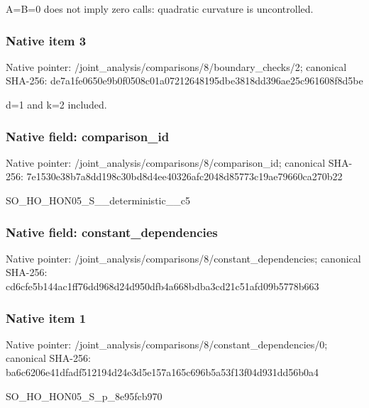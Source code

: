 \documentclass[10pt,a4paper]{article}
\begin{document}
\begingroup\raggedright\sloppy A=\allowbreak{}B=\allowbreak{}0 does not imply zero calls:\allowbreak{} quadratic curvature is uncontrolled.\par\endgroup

\subsubsection{Native item 3}
Native pointer: /joint\_\allowbreak{}analysis/comparisons/8/boundary\_\allowbreak{}checks/2; canonical SHA-256: de7a1fe0650e9b0f0508c01a07212648195dbe3818dd396ae25c961608f8d5be

\begingroup\raggedright\sloppy d=\allowbreak{}1 and k=\allowbreak{}2 included.\par\endgroup

\subsubsection{Native field: comparison\_\allowbreak{}id}
Native pointer: /joint\_\allowbreak{}analysis/comparisons/8/comparison\_\allowbreak{}id; canonical SHA-256: 7e1530e38b7a8dd198c30bd8d4ee40326afc2048d85773c19ae79660ca270b22

\begingroup\raggedright\sloppy SO\_\allowbreak{}HO\_\allowbreak{}HON05\_\allowbreak{}S\_\allowbreak{}\_\allowbreak{}deterministic\_\allowbreak{}\_\allowbreak{}c5\par\endgroup

\subsubsection{Native field: constant\_\allowbreak{}dependencies}
Native pointer: /joint\_\allowbreak{}analysis/comparisons/8/constant\_\allowbreak{}dependencies; canonical SHA-256: cd6cfe5b144ac1ff76dd968d24d950dfb4a668bdba3cd21c51afd09b5778b663

\subsubsection{Native item 1}
Native pointer: /joint\_\allowbreak{}analysis/comparisons/8/constant\_\allowbreak{}dependencies/0; canonical SHA-256: ba6c6206e41dfadf512194d24e3d5e157a165c696b5a53f13f04d931dd56b0a4

\begingroup\raggedright\sloppy SO\_\allowbreak{}HO\_\allowbreak{}HON05\_\allowbreak{}S\_\allowbreak{}p\_\allowbreak{}8e95fcb970\par\endgroup
\end{document}
